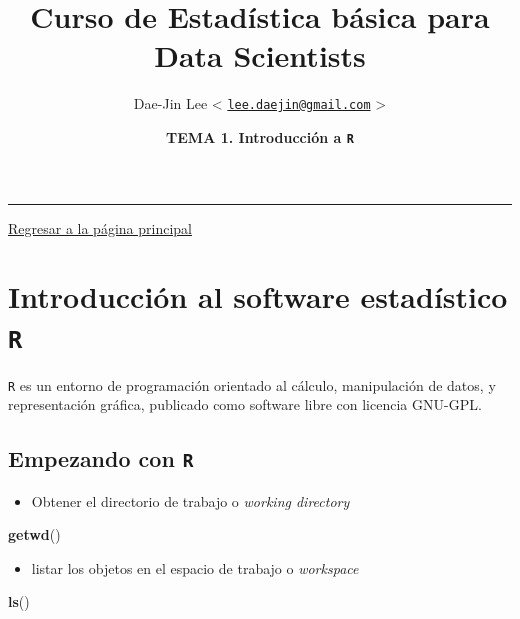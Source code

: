 \documentclass[]{article}
\title{\textbf{Curso de Estadística básica para Data Scientists}}
\author{Dae-Jin Lee \textless{}
\href{mailto:lee.daejin@gmail.com}{\nolinkurl{lee.daejin@gmail.com}}
\textgreater{}}
\date{\textbf{TEMA 1. Introducción a \texttt{R}}}
\def\tightlist{}
\newenvironment{Shaded}{\begin{snugshade}}{\end{snugshade}}
\newcommand{\KeywordTok}[1]{\textcolor[rgb]{0.13,0.29,0.53}{\textbf{{#1}}}}
\newcommand{\NormalTok}[1]{{#1}}
\numberwithin{equation}{section}
\begin{document}
\maketitle

{
\hypersetup{linkcolor=black}
\setcounter{tocdepth}{2}
\tableofcontents
}
\begin{center}\rule{0.5\linewidth}{\linethickness}\end{center}

\newpage

\href{https://idaejin.github.io/bcam-courses/R/datahack/}{Regresar a la
página principal}

\section{\texorpdfstring{Introducción al software estadístico
\texttt{R}}{Introducción al software estadístico R}}\label{introduccion-al-software-estadistico-r}

\texttt{R} es un entorno de programación orientado al cálculo,
manipulación de datos, y representación gráfica, publicado como software
libre con licencia GNU-GPL.

\subsection{\texorpdfstring{Empezando con
\texttt{R}}{Empezando con R}}\label{empezando-con-r}

\begin{itemize}
\tightlist
\item
  Obtener el directorio de trabajo o \emph{working directory}
\end{itemize}

\begin{Shaded}
\begin{Highlighting}[]
\KeywordTok{getwd}\NormalTok{() }
\end{Highlighting}
\end{Shaded}

\begin{itemize}
\tightlist
\item
  listar los objetos en el espacio de trabajo o \emph{workspace}
\end{itemize}

\begin{Shaded}
\begin{Highlighting}[]
\KeywordTok{ls}\NormalTok{()}
\end{Highlighting}
\end{Shaded}
\end{document}
